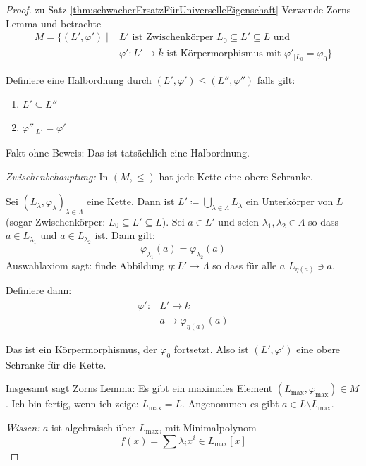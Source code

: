 \documentclass[12pt,parskip=full]{scrartcl}
\theoremstyle{definition}
\theoremstyle{remark}
\begin{document}
	\begin{proof} zu Satz \ref{thm:schwacherErsatzFürUniverselleEigenschaft}
		Verwende Zorns Lemma und betrachte
		\begin{align*}
			M = \{ (L', \varphi') \mid &L' \text{ ist Zwischenkörper } L_0 \subseteq L' \subseteq L \text{ und } \\
			&\varphi': L' \to \overline{k} \text{ ist Körpermorphismus mit } \varphi'_{\mid L_0} = \varphi_0 \}
		\end{align*}
		
		Definiere eine Halbordnung durch $(L', \varphi') \leq (L'', \varphi'')$ falls gilt:
		\begin{enumerate}
			\item $L' \subseteq L''$
			\item $\varphi''_{\mid L'} = \varphi'$
		\end{enumerate}
		Fakt ohne Beweis: Das ist tatsächlich eine Halbordnung.
		
		\textit{Zwischenbehauptung:} In $(M, \leq)$ hat jede Kette eine obere Schranke.
		
		Sei $(L_\lambda, \varphi_\lambda)_{\lambda \in \Lambda}$ eine Kette. Dann ist $L' \coloneqq \bigcup_{\lambda \in \Lambda} L_\lambda$ ein Unterkörper von $L$ (sogar Zwischenkörper: $L_0 \subseteq L' \subseteq L$). Sei $a \in L'$ und seien $\lambda_1, \lambda_2 \in \Lambda$ so dass $a \in L_{\lambda_1}$ und $a \in L_{\lambda_2}$ ist. Dann gilt:
		\begin{equation*}
			\varphi_{\lambda_1}(a) = \varphi_{\lambda_2}(a)
		\end{equation*}
		Auswahlaxiom sagt: finde Abbildung $\eta: L' \to \Lambda$ so dass für alle $a$ $L_{\eta(a)} \ni a$.
		
		Definiere dann:
		\begin{align*}
			\varphi': &L' \to \overline{k} \\
			&a \to \varphi_{\eta(a)}(a)
		\end{align*}
		
		Das ist ein Körpermorphismus, der $\varphi_0$ fortsetzt. Also ist $(L', \varphi')$ eine obere Schranke für die Kette.
		
		Insgesamt sagt Zorns Lemma: Es gibt ein maximales Element $(L_\text{max}, \varphi_\text{max}) \in M$. Ich bin fertig, wenn ich zeige:
		$L_\text{max} = L$. Angenommen es gibt $a \in L \setminus L_\text{max}$.
		
		\textit{Wissen:} $a$ ist algebraisch über $L_\text{max}$, mit Minimalpolynom
		\begin{equation*}
			f(x) = \sum \lambda_i x^i \in L_\text{max}[x]
		\end{equation*}
		

\end{proof}
\end{document}

